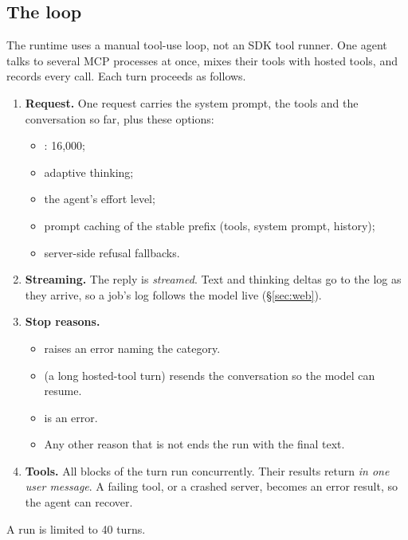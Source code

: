 \documentclass[11pt,a4paper]{article}
\makeatletter
\newcommand{\snippetsource}[1]{\csname snippet@#1\endcsname}
\newcommand{\snippet}[3]{%
  }
\makeatother
\begin{document}
\subsection{The loop}
The runtime uses a manual tool-use loop, not an SDK tool runner. One agent talks to several
MCP processes at once, mixes their tools with hosted tools, and records every call. Each
turn proceeds as follows.
\begin{enumerate}
  \item \textbf{Request.} One request carries the system prompt, the tools and the
        conversation so far, plus these options:
        \begin{itemize}
          \item {}: 16,000;
          \item adaptive thinking;
          \item the agent's effort level;
          \item prompt caching of the stable prefix (tools, system prompt, history);
          \item server-side refusal fallbacks.
        \end{itemize}
  \item \textbf{Streaming.} The reply is \emph{streamed}. Text and thinking deltas go to
        the log as they arrive, so a job's log follows the model live (\S\ref{sec:web}).
  \item \textbf{Stop reasons.}
        \begin{itemize}
          \item {} raises an error naming the category.
          \item {} (a long hosted-tool turn) resends the conversation so
                the model can resume.
          \item {} is an error.
          \item Any other reason that is not  ends the run with the final
                text.
        \end{itemize}
  \item \textbf{Tools.} All  blocks of the turn run concurrently. Their
        results return \emph{in one user message}. A failing tool, or a crashed server,
        becomes an error result, so the agent can recover.
\end{enumerate}
A run is limited to 40 turns.
\snippet{runtime_loop}{Python}{The agent loop}
\snippet{runtime_create}{Python}{One streamed model turn}
\snippet{live_output}{Python}{Live logging of streamed output}
\snippet{runtime_call_tool}{Python}{Executing one tool call on its MCP server}
\end{document}
